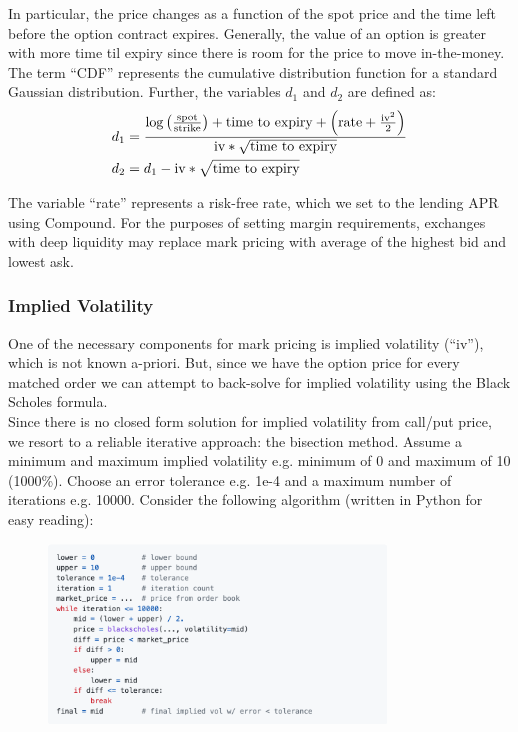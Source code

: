 \documentclass{article}
\begin{document}
\noindent In particular, the price changes as a function of the spot price and the time left before the option contract expires. Generally, the value of an option is greater with more time til expiry since there is room for the price to move in-the-money. The term ``CDF'' represents the cumulative distribution function for a standard Gaussian distribution. Further, the variables $d_1$ and $d_2$ are defined as:
\begin{align}
    d_1 &= \frac{\log\left(\frac{\textup{spot}}{\textup{strike}}\right) + \textup{time to expiry} + \left(\textup{rate} + \frac{\textup{iv}^2}{2}\right)}{\textup{iv} * \sqrt{\textup{time to expiry}}} \\
    d_2 &= d_1 - \textup{iv} * \sqrt{\textup{time to expiry}}
\end{align}

\noindent The variable ``rate'' represents a risk-free rate, which we set to the lending APR using Compound.  For the purposes of setting margin requirements, exchanges with deep liquidity may replace mark pricing with average of the highest bid and lowest ask. 

\subsubsection{Implied Volatility} 
\label{sec:bisection}

One of the necessary components for mark pricing is implied volatility (``iv''), which is not known a-priori. But, since we have the option price for every matched order we can attempt to back-solve for implied volatility using the Black Scholes formula.\\

\noindent Since there is no closed form solution for implied volatility from call/put price, we resort to a reliable iterative approach: the bisection method. Assume a minimum and maximum implied volatility e.g. minimum of 0 and maximum of 10 (1000\%). Choose an error tolerance e.g. 1e-4 and a maximum number of iterations e.g. 10000. Consider the following algorithm (written in Python for easy reading):

\begin{figure}[h]
    \centering
    \includegraphics[width=0.8\textwidth]{images/code.png}
\end{figure}
\end{document}
